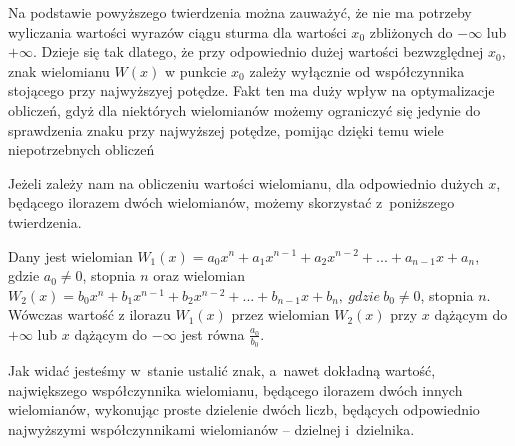 Na podstawie powyższego twierdzenia można zauważyć, że nie ma potrzeby wyliczania wartości wyrazów ciągu sturma dla wartości $x_0$ zbliżonych do $-\infty$ lub $+\infty.$ Dzieje się tak dlatego, że przy odpowiednio dużej wartości bezwzględnej $x_0$, znak wielomianu $W(x)$ w punkcie $x_0$ zależy wyłącznie od współczynnika stojącego przy najwyższyej potędze. Fakt ten ma duży wpływ na optymalizacje obliczeń, gdyż dla niektórych wielomianów możemy ograniczyć się jedynie do sprawdzenia znaku przy najwyższej potędze, pomijąc dzięki temu wiele niepotrzebnych obliczeń

Jeżeli zależy nam na obliczeniu wartości wielomianu, dla odpowiednio dużych $x$, będącego ilorazem dwóch wielomianów, możemy skorzystać z~poniższego twierdzenia.

\begin{theorem}
	$ $ \\
	Dany jest wielomian $W_1(x) = a_0x^n + a_1x^{n-1} + a_2x^{n-2} + ... + a_{n-1}x + a_n$, gdzie $a_0 \ne 0$, stopnia $n$ oraz wielomian $W_2(x) = b_0x^n + b_1x^{n-1} + b_2x^{n-2} + ... + b_{n-1}x + b_n,\ gdzie\ b_0 \ne 0$, stopnia $n$. Wówczas
	wartość z ilorazu $W_1(x)$ przez wielomian $W_2(x)$ przy $x$ dążącym do $+\infty$ lub $x$ dążącym do $-\infty$ jest równa $\frac{a_0}{b_0}$.
\end{theorem}

Jak widać jesteśmy w~stanie ustalić znak, a~nawet dokładną wartość, największego współczynnika wielomianu, będącego ilorazem dwóch innych wielomianów, wykonując proste dzielenie dwóch liczb, będących odpowiednio najwyższymi współczynnikami wielomianów -- dzielnej i~dzielnika.